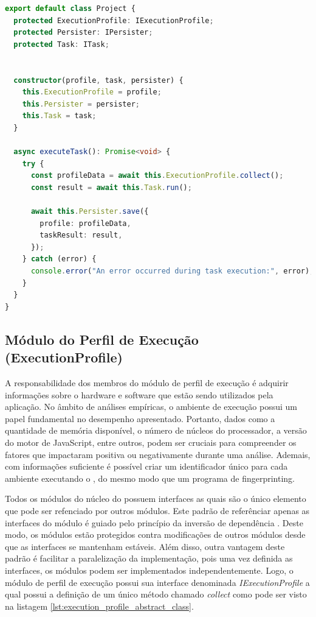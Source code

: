 \documentclass[12pt]{tcc}
\begin{document}
\begin{lstlisting}[label={lst:project_class}, caption={Amostra da implementação da classe \emph{Project}.}, language=TypeScript, breaklines=true]
export default class Project {
  protected ExecutionProfile: IExecutionProfile;
  protected Persister: IPersister;
  protected Task: ITask;


  constructor(profile, task, persister) {
    this.ExecutionProfile = profile;
    this.Persister = persister;
    this.Task = task;
  }

  async executeTask(): Promise<void> {
    try {
      const profileData = await this.ExecutionProfile.collect();
      const result = await this.Task.run();
  
      await this.Persister.save({
        profile: profileData,
        taskResult: result,
      });
    } catch (error) {
      console.error("An error occurred during task execution:", error);
    }
  }
}
\end{lstlisting}


	\subsection{Módulo do Perfil de Execução (ExecutionProfile)}
	\label{subsection:modulo-execution-profile}

	
	A responsabilidade dos membros do módulo de perfil de execução é adquirir informações sobre o hardware e software que estão sendo utilizados pela aplicação.
	No âmbito de análises empíricas, o ambiente de execução possui um papel fundamental no desempenho apresentado.
	Portanto, dados como a quantidade de memória disponível, o número de núcleos do processador, a versão do motor de JavaScript, entre outros, podem ser cruciais para compreender os fatores que impactaram positiva ou negativamente durante uma análise.
	Ademais, com informações suficiente é possível criar um identificador único para cada ambiente executando o , do mesmo modo que um programa de fingerprinting.
	
	Todos os módulos do núcleo do  possuem interfaces as quais são o único elemento que pode ser refenciado por outros módulos.
	Este padrão de referênciar apenas as interfaces do módulo é guiado pelo princípio da inversão de dependência \citep{MartinCleanArchtecture2017}.
	Deste modo, os módulos estão protegidos contra modificações de outros módulos desde que as interfaces se mantenham estáveis.
	Além disso, outra vantagem deste padrão é facilitar a paralelização da implementação, pois uma vez definida as interfaces, os módulos podem ser implementados independentemente.
	Logo, o módulo de perfil de execução possui sua interface denominada \emph{IExecutionProfile} a qual possui a definição de um único método chamado \emph{collect} como pode ser visto na listagem \ref{lst:execution_profile_abstract_class}.
\end{document}
